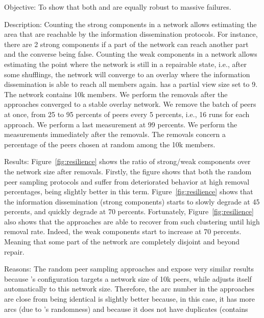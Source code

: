 \begin{asparadesc}
\item[Objective:] To show that both \SPRAY and \CYCLON are equally robust to
  massive failures.
\item[Description:] Counting the strong components in a network allows
  estimating the area that are reachable by the information dissemination
  protocols. For instance, there are 2 strong components if a part of the
  network can reach another part and the converse being false.  Counting the
  weak components in a network allows estimating the point where the network is
  still in a repairable state, i.e., after some shufflings, the network will
  converge to an overlay where the information dissemination is able to reach
  all members again. \CYCLON has a partial view size set to 9. The network
  contains 10k members. We perform the removals after the approaches converged
  to a stable overlay network. We remove the batch of peers at once, from 25 to
  95 percents of peers every 5 percents, i.e., 16 runs for each approach. We
  perform a last measurement at 99 percents. We perform the measurements
  immediately after the removals. The removals concern a percentage of the
  peers chosen at random among the 10k members.
\item[Results:] Figure~\ref{fig:resilience} shows the ratio of strong/weak
  components over the network size after removals. Firstly, the figure shows
  that both the random peer sampling protocols \SPRAY and \CYCLON suffer from
  deteriorated behavior at high removal percentages, \CYCLON being slightly
  better in this term. Figure~\ref{fig:resilience} shows that the information
  dissemination (strong components) starts to slowly degrade at 45 percents,
  and quickly degrade at 70 percents. Fortunately, Figure~\ref{fig:resilience}
  also shows that the approaches are able to recover from such clustering until
  high removal rate. Indeed, the weak components start to increase at 70
  percents. Meaning that some part of the network are completely disjoint and
  beyond repair.
\item[Reasons:] The random peer sampling approaches \CYCLON and \SPRAY expose
  very similar results because \CYCLON's configuration targets a network size
  of 10k peers, while \SPRAY adjusts itself automatically to this network size.
  Therefore, the arc number in the approaches are close from being identical
  \CYCLON is slightly better because, in this case, it has more arcs (due to
  \SPRAY's randomness) and because it does not have duplicates (\SPRAY contains

\end{asparadesc}

